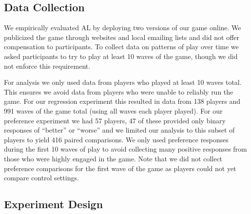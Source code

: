 \documentclass{sig-alternate}
\begin{document}
%

%


\subsection{Data Collection}

We empirically evaluated AL by deploying two versions of our game online.
We publicized the game through websites and local emailing lists and did not offer compensation to participants.
To collect data on patterns of play over time we asked participants to try to play at least 10 waves of the game, though we did not enforce this requirement.

For analysis we only used data from players who played at least 10 waves total.
This ensures we avoid data from players who were unable to reliably run the game.
For our regression experiment this resulted in data from 138 players and 991 waves of the game total (using all waves each player played).
For our preference experiment we had 57 players, 47 of these provided only binary responses of ``better'' or ``worse'' and we limited our analysis to this subset of players to yield 416 paired comparisons.
We only used preference responses during the first 10 waves of play to avoid collecting many positive responses from those who were highly engaged in the game.
Note that we did not collect preference comparisons for the first wave of the game as players could not yet compare control settings.



\subsection{Experiment Design}
\end{document}
